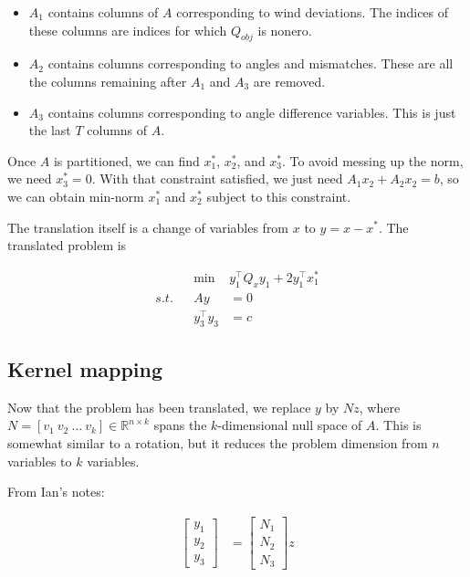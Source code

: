 \documentclass{article}
\begin{document}
\begin{itemize}
\item
  $A_1$ contains columns of $A$ corresponding to wind deviations. The
  indices of these columns are indices for which $Q_{obj}$ is nonero.
\item
  $A_2$ contains columns corresponding to angles and mismatches. These
  are all the columns remaining after $A_1$ and $A_3$ are removed.
\item
  $A_3$ contains columns corresponding to angle difference variables.
  This is just the last $T$ columns of $A$.
\end{itemize}

    Once $A$ is partitioned, we can find $x_1^*$, $x_2^*$, and $x_3^*$. To
avoid messing up the norm, we need $x_3^*=0$. With that constraint
satisfied, we just need $A_1x_2 + A_2x_2 = b$, so we can obtain min-norm
$x_1^*$ and $x_2^*$ subject to this constraint.

    The translation itself is a change of variables from $x$ to
$y = x - x^*$. The translated problem is

\begin{align}
&& \min~ & y_1^\top Q_x y_1 + 2 y_1^\top x_1^* \\
s.t. && Ay &= 0 \\
&& y_3^\top y_3 &= c
\end{align}

    \subsection{Kernel mapping}\label{kernel-mapping}

Now that the problem has been translated, we replace $y$ by $Nz$, where
$N=[v_1~v_2~\ldots~v_k]\in\mathbb{R}^{n\times k}$ spans the
$k$-dimensional null space of $A$. This is somewhat similar to a
rotation, but it reduces the problem dimension from $n$ variables to $k$
variables.

From Ian's notes:

\begin{align}
\begin{bmatrix} y_1 \\ y_2 \\ y_3 \end{bmatrix}
&= \begin{bmatrix} N_1 \\ N_2 \\ N_3 \end{bmatrix} z
\end{align}
\end{document}
